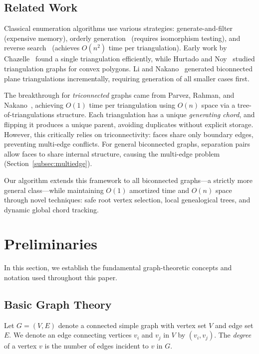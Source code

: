 \documentclass[12pt,a4paper]{article}
\theoremstyle{definition}
\theoremstyle{remark}
\begin{document}
\subsection{Related Work}

Classical enumeration algorithms use various strategies: generate-and-filter (expensive memory), orderly generation~\cite{read1978} (requires isomorphism testing), and reverse search~\cite{avis1996} (achieves $O(n^2)$ time per triangulation). Early work by Chazelle~\cite{chazelle1991} found a single triangulation efficiently, while Hurtado and Noy~\cite{hurtado1999} studied triangulation graphs for convex polygons. Li and Nakano~\cite{li2001} generated biconnected plane triangulations incrementally, requiring generation of all smaller cases first.

The breakthrough for \emph{triconnected} graphs came from Parvez, Rahman, and Nakano~\cite{parvez2011}, achieving $O(1)$ time per triangulation using $O(n)$ space via a tree-of-triangulations structure. Each triangulation has a unique \emph{generating chord}, and flipping it produces a unique parent, avoiding duplicates without explicit storage. However, this critically relies on triconnectivity: faces share only boundary edges, preventing multi-edge conflicts. For general biconnected graphs, separation pairs allow faces to share internal structure, causing the multi-edge problem (Section~\ref{subsec:multiedge}).

Our algorithm extends this framework to all biconnected graphs—a strictly more general class—while maintaining $O(1)$ amortized time and $O(n)$ space through novel techniques: safe root vertex selection, local genealogical trees, and dynamic global chord tracking.

\section{Preliminaries}
\label{sec:preliminaries}

In this section, we establish the fundamental graph-theoretic concepts and notation used throughout this paper.

\subsection{Basic Graph Theory}

Let $G = (V,E)$ denote a connected simple graph with vertex set $V$ and edge set $E$. We denote an edge connecting vertices $v_i$ and $v_j$ in $V$ by $(v_i,v_j)$. The \emph{degree} of a vertex $v$ is the number of edges incident to $v$ in $G$. 
\end{document}

